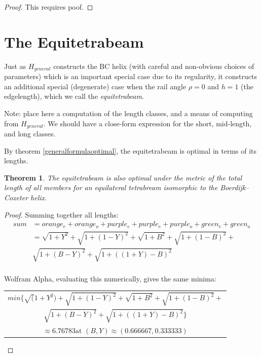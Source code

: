 \documentclass[11pt]{article}
\newtheorem{theorem}{Theorem}
\begin{document}
\begin{proof}
  This requires poof.
  \end{proof}

\section{The Equitetrabeam}

Just as $H_{general}$ constructs the BC helix (with careful and non-obvious choices of parameters) which is an important
special case due to its regularity, it constructs an additional special (degenerate) case when the rail angle $\rho = 0$
and $h = 1$ (the edgelength), which we call the \emph{equitetrabeam}.

Note: place here a computation of the length classes, and a means of computing from $H_{general}$.
We should have a close-form expression for the short, mid-length, and long classes.

By theorem \ref{generalformulaoptimal}, the equitetrabeam is optimal in terms of its lengths.


\begin{theorem}
  The equitetrabeam is also optimal under the metric of the total length of all members 
  for an equilateral tetrabream isomorphic to the Boerdijk--Coxeter helix.
\end{theorem}

\begin{proof}
  Summing together all lengths:
  \begin{align*}
  sum &= orange_e + orange_o + purple_e + purple_e + purple_o + green_e + green_o \\    
  &= \sqrt{1 + Y^2} + \sqrt{1 + (1-Y)^2} + \sqrt{1 + B^2} + \sqrt{1+ (1-B)^2} + \\
  & \sqrt{1 + (B - Y)^2} +  \sqrt{1 + ((1+Y) - B)^2} \\
  \end{align*} 

  Wolfram Alpha, evaluating this numerically, gives the same minima:
  
  \begin{tabular}{c}    
$  min\{\sqrt(1 + Y^2) + \sqrt{1 + (1 - Y)^2} + \sqrt{1 + B^2} + \sqrt{1 + (1 - B)^2} + $\\
    $  \sqrt{1 + (B - Y)^2} + \sqrt{1 + ((1 + Y) - B)^2}\} $ \\
    $ \approx 6.76783 \text{at } (B, Y) \approx (0.666667, 0.333333) $
  \end{tabular}

  
\end{proof}
\end{document}
